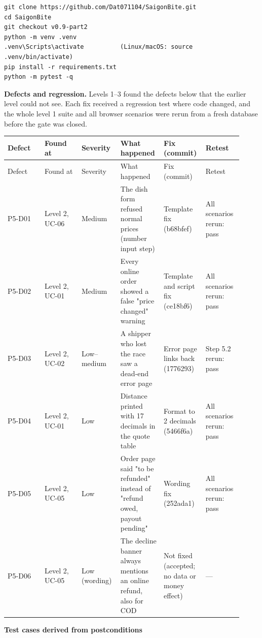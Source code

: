 \begin{lstlisting}
git clone https://github.com/Dat071104/SaigonBite.git
cd SaigonBite
git checkout v0.9-part2
python -m venv .venv
.venv\Scripts\activate          (Linux/macOS: source .venv/bin/activate)
pip install -r requirements.txt
python -m pytest -q
\end{lstlisting}
\textbf{Defects and regression.} Levels 1--3 found the defects below that the earlier level could not see. Each fix received a regression test where code changed, and the whole level 1 suite and all browser scenarios were rerun from a fresh database before the gate was closed.

\begingroup\footnotesize
\begin{longtable}{>{\raggedright\arraybackslash}p{0.1533\linewidth}>{\raggedright\arraybackslash}p{0.1533\linewidth}>{\raggedright\arraybackslash}p{0.1533\linewidth}>{\raggedright\arraybackslash}p{0.1533\linewidth}>{\raggedright\arraybackslash}p{0.1533\linewidth}>{\raggedright\arraybackslash}p{0.1533\linewidth}}
Defect & Found at & Severity & What happened & Fix (commit) & Retest \\
\hline\endfirsthead
Defect & Found at & Severity & What happened & Fix (commit) & Retest \\
\hline\endhead
P5-D01 & Level 2, UC-06 & Medium & The dish form refused normal prices (number input step) & Template fix (b68bfef) & All scenarios rerun: pass \\
P5-D02 & Level 2, UC-01 & Medium & Every online order showed a false "price changed" warning & Template and script fix (ce18bf6) & All scenarios rerun: pass \\
P5-D03 & Level 2, UC-02 & Low--medium & A shipper who lost the race saw a dead-end error page & Error page links back (1776293) & Step 5.2 rerun: pass \\
P5-D04 & Level 2, UC-01 & Low & Distance printed with 17 decimals in the quote table & Format to 2 decimals (5466f6a) & All scenarios rerun: pass \\
P5-D05 & Level 2, UC-05 & Low & Order page said "to be refunded" instead of "refund owed, payout pending" & Wording fix (252ada1) & All scenarios rerun: pass \\
P5-D06 & Level 2, UC-05 & Low (wording) & The decline banner always mentions an online refund, also for COD & Not fixed (accepted; no data or money effect) & --- \\
\end{longtable}
\endgroup
\textbf{Test cases derived from postconditions}

